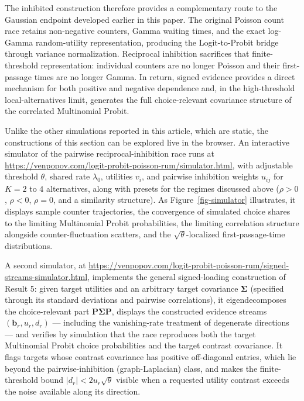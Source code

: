 \documentclass[
  man,
  floatsintext,
  longtable,
  a4paper,
  nolmodern,
  notxfonts,
  notimes,
  colorlinks=true,linkcolor=blue,citecolor=blue,urlcolor=blue]{apa7}
\begin{document}
The inhibited construction therefore provides a complementary route to
the Gaussian endpoint developed earlier in this paper. The original
Poisson count race retains non-negative counters, Gamma waiting times,
and the exact log-Gamma random-utility representation, producing the
Logit-to-Probit bridge through variance normalization. Reciprocal
inhibition sacrifices that finite-threshold representation: individual
counters are no longer Poisson and their first-passage times are no
longer Gamma. In return, signed evidence provides a direct mechanism for
both positive and negative dependence and, in the high-threshold
local-alternatives limit, generates the full choice-relevant covariance
structure of the correlated Multinomial Probit.

\begin{tcolorbox}[enhanced jigsaw, colframe=quarto-callout-tip-color-frame, leftrule=.75mm, colbacktitle=quarto-callout-tip-color!10!white, titlerule=0mm, bottomrule=.15mm, opacityback=0, rightrule=.15mm, toptitle=1mm, bottomtitle=1mm, breakable, title={Explore this model interactively}, arc=.35mm, coltitle=black, opacitybacktitle=0.6, left=2mm, toprule=.15mm, colback=white]

Unlike the other simulations reported in this article, which are static,
the constructions of this section can be explored live in the browser.
An interactive simulator of the pairwise reciprocal-inhibition race runs
at \url{https://venpopov.com/logit-probit-poisson-rum/simulator.html},
with adjustable threshold \(\theta\), shared rate \(\lambda_0\),
utilities \(v_i\), and pairwise inhibition weights \(u_{ij}\) for
\(K = 2\) to \(4\) alternatives, along with presets for the regimes
discussed above (\(\rho > 0\), \(\rho < 0\), \(\rho = 0\), and a
similarity structure). As Figure~\ref{fig-simulator} illustrates, it
displays sample counter trajectories, the convergence of simulated
choice shares to the limiting Multinomial Probit probabilities, the
limiting correlation structure alongside counter-fluctuation scatters,
and the \(\sqrt{\theta}\)-localized first-passage-time distributions.

A second simulator, at
\url{https://venpopov.com/logit-probit-poisson-rum/signed-streams-simulator.html},
implements the general signed-loading construction of Result 5: given
target utilities and an arbitrary target covariance
\(\boldsymbol\Sigma\) (specified through its standard deviations and
pairwise correlations), it eigendecomposes the choice-relevant part
\(\mathbf P\boldsymbol\Sigma\mathbf P\), displays the constructed
evidence streams \((\mathbf b_r, u_r, d_r)\) --- including the
vanishing-rate treatment of degenerate directions --- and verifies by
simulation that the race reproduces both the target Multinomial Probit
choice probabilities and the target contrast covariance. It flags
targets whose contrast covariance has positive off-diagonal entries,
which lie beyond the pairwise-inhibition (graph-Laplacian) class, and
makes the finite-threshold bound \(|d_r| < 2u_r\sqrt{\theta}\) visible
when a requested utility contrast exceeds the noise available along its
direction.

\end{tcolorbox}
\end{document}

